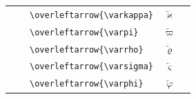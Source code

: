\documentclass[12pt,a4paper]{article}
\begin{document}
\begin{longtable}{|l|c|l|c|c|}
                                   &                               & \verb|\overleftarrow{\varkappa}|   & $\overleftarrow{\varkappa}$   & \\
                                   &                               & \verb|\overleftarrow{\varpi}|      & $\overleftarrow{\varpi}$      & \\
                                   &                               & \verb|\overleftarrow{\varrho}|     & $\overleftarrow{\varrho}$     & \\
                                   &                               & \verb|\overleftarrow{\varsigma}|   & $\overleftarrow{\varsigma}$   & \\
                                   &                               & \verb|\overleftarrow{\varphi}|     & $\overleftarrow{\varphi}$     & \\
\hline
\end{longtable}
\end{document}
